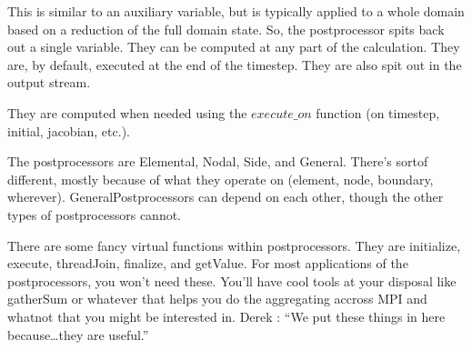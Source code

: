 This is similar to an auxiliary variable, but is typically applied to a whole 
domain based on a reduction of the full domain state. So, the postprocessor 
spits back out a single variable. They can be computed at any part of the 
calculation. They are, by default, executed at the end of the timestep. They are 
also spit out in the output stream.

They are computed when needed using the $execute\_on$ function (on timestep, 
initial, jacobian, etc.). 


The postprocessors are Elemental, Nodal, Side, and General. There's sortof 
different, mostly because of what they operate on (element, node, boundary, 
wherever). GeneralPostprocessors can depend on each other, though the other 
types of postprocessors cannot. 

There are some fancy virtual functions within postprocessors. They are 
initialize, execute, threadJoin, finalize, and getValue. For most applications 
of the postprocessors, you won't need these. You'll have cool tools at your 
disposal like gatherSum or whatever that helps you do the aggregating accross 
MPI and whatnot that you might be interested in. Derek : ``We put these things in 
here because\ldots they are useful.''


